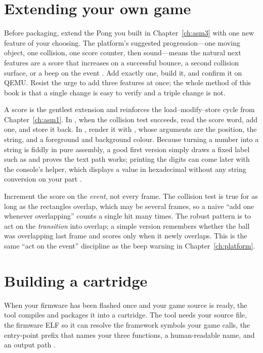 \section{Extending your own game}

Before packaging, extend the Pong you built in Chapter~\ref{ch:asm3} with one new
feature of your choosing. The platform's suggested progression---one moving
object, one collision, one score counter, then sound---means the natural next
features are a score that increases on a successful bounce, a second collision
surface, or a beep on the event \citep{prg32tutorial}. Add exactly one, build it,
and confirm it on QEMU. Resist the urge to add three features at once; the whole
method of this book is that a single change is easy to verify and a triple change
is not.

A score is the gentlest extension and reinforces the load--modify--store cycle
from Chapter~\ref{ch:asm1}. In , when the collision test succeeds,
read the score word, add one, and store it back. In , render it with
, whose arguments are the position, the string, and a
foreground and background colour. Because turning a number into a string is
fiddly in pure assembly, a good first version simply draws a fixed label such as
 and proves the text path works; printing the digits can come later
with the console's  helper, which displays a value in
hexadecimal without any string conversion on your part \citep{prg32repo}.

\begin{prgwarn}
Increment the score on the \emph{event}, not every frame. The collision test is
true for as long as the rectangles overlap, which may be several frames, so a
naive ``add one whenever overlapping'' counts a single hit many times. The robust
pattern is to act on the \emph{transition} into overlap; a simple version remembers
whether the ball was overlapping last frame and scores only when it newly
overlaps. This is the same ``act on the event'' discipline as the beep warning in
Chapter~\ref{ch:platform}.
\end{prgwarn}

\section{Building a cartridge}

When your firmware has been flashed once and your game source is ready, the
 tool compiles and packages it into a 
cartridge. The tool needs your source file, the firmware ELF so it can resolve
the framework symbols your game calls, the entry-point prefix that names your
three functions, a human-readable name, and an output path \citep{prg32tutorial}.

